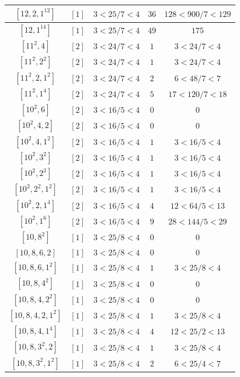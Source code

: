 \documentclass{article}%
\begin{document}
\begin{center}
\begin{longtable}{||c|c|c|c|c||}
$[12, 2, 1^{12}]$ & $[1]$ & $3 < 25/7 < 4$ & $36$ & $128 < 900/7 < 129$ \\ \hline 
$[12, 1^{14}]$ & $[1]$ & $3 < 25/7 < 4$ & $49$ & $175$ \\ \hline 
$[11^{2}, 4]$ & $[2]$ & $3 < 24/7 < 4$ & $1$ & $3 < 24/7 < 4$ \\ \hline 
$[11^{2}, 2^{2}]$ & $[2]$ & $3 < 24/7 < 4$ & $1$ & $3 < 24/7 < 4$ \\ \hline 
$[11^{2}, 2, 1^{2}]$ & $[2]$ & $3 < 24/7 < 4$ & $2$ & $6 < 48/7 < 7$ \\ \hline 
$[11^{2}, 1^{4}]$ & $[2]$ & $3 < 24/7 < 4$ & $5$ & $17 < 120/7 < 18$ \\ \hline 
$[10^{2}, 6]$ & $[2]$ & $3 < 16/5 < 4$ & $0$ & $0$ \\ \hline 
$[10^{2}, 4, 2]$ & $[2]$ & $3 < 16/5 < 4$ & $0$ & $0$ \\ \hline 
$[10^{2}, 4, 1^{2}]$ & $[2]$ & $3 < 16/5 < 4$ & $1$ & $3 < 16/5 < 4$ \\ \hline 
$[10^{2}, 3^{2}]$ & $[2]$ & $3 < 16/5 < 4$ & $1$ & $3 < 16/5 < 4$ \\ \hline 
$[10^{2}, 2^{3}]$ & $[2]$ & $3 < 16/5 < 4$ & $1$ & $3 < 16/5 < 4$ \\ \hline 
$[10^{2}, 2^{2}, 1^{2}]$ & $[2]$ & $3 < 16/5 < 4$ & $1$ & $3 < 16/5 < 4$ \\ \hline 
$[10^{2}, 2, 1^{4}]$ & $[2]$ & $3 < 16/5 < 4$ & $4$ & $12 < 64/5 < 13$ \\ \hline 
$[10^{2}, 1^{6}]$ & $[2]$ & $3 < 16/5 < 4$ & $9$ & $28 < 144/5 < 29$ \\ \hline 
$[10, 8^{2}]$ & $[1]$ & $3 < 25/8 < 4$ & $0$ & $0$ \\ \hline 
$[10, 8, 6, 2]$ & $[1]$ & $3 < 25/8 < 4$ & $0$ & $0$ \\ \hline 
$[10, 8, 6, 1^{2}]$ & $[1]$ & $3 < 25/8 < 4$ & $1$ & $3 < 25/8 < 4$ \\ \hline 
$[10, 8, 4^{2}]$ & $[1]$ & $3 < 25/8 < 4$ & $0$ & $0$ \\ \hline 
$[10, 8, 4, 2^{2}]$ & $[1]$ & $3 < 25/8 < 4$ & $0$ & $0$ \\ \hline 
$[10, 8, 4, 2, 1^{2}]$ & $[1]$ & $3 < 25/8 < 4$ & $1$ & $3 < 25/8 < 4$ \\ \hline 
$[10, 8, 4, 1^{4}]$ & $[1]$ & $3 < 25/8 < 4$ & $4$ & $12 < 25/2 < 13$ \\ \hline 
$[10, 8, 3^{2}, 2]$ & $[1]$ & $3 < 25/8 < 4$ & $1$ & $3 < 25/8 < 4$ \\ \hline 
$[10, 8, 3^{2}, 1^{2}]$ & $[1]$ & $3 < 25/8 < 4$ & $2$ & $6 < 25/4 < 7$ \\ \hline 

\end{longtable}
\end{center}
\end{document}
